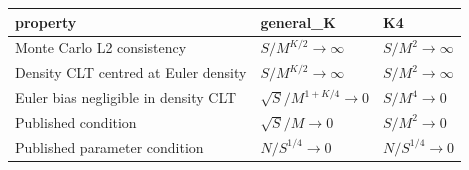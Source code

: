 \begin{tabular}{lll}
\toprule
property & general_K & K4 \\
\midrule
Monte Carlo L2 consistency & $S/M^{K/2}\to\infty$ & $S/M^2\to\infty$ \\
Density CLT centred at Euler density & $S/M^{K/2}\to\infty$ & $S/M^2\to\infty$ \\
Euler bias negligible in density CLT & $\sqrt{S}/M^{1+K/4}\to0$ & $S/M^4\to0$ \\
Published condition & $\sqrt{S}/M\to0$ & $S/M^2\to0$ \\
Published parameter condition & $N/S^{1/4}\to0$ & $N/S^{1/4}\to0$ \\
\bottomrule
\end{tabular}
